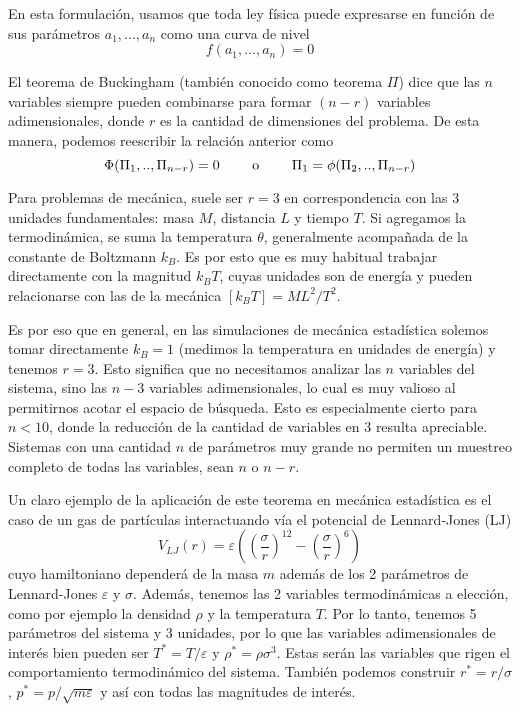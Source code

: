 En esta formulación, usamos que toda ley física puede expresarse en función de sus parámetros $a_1,...,a_n$ como una curva de nivel
\[ f(a_1,...,a_n) = 0 \]

El teorema de Buckingham\cite[pp. 21-22]{BOOK:KUNDU} (también conocido como teorema $\Pi$) dice que las $n$ variables siempre pueden combinarse para formar 
$(n-r)$ variables adimensionales, donde $r$ es la cantidad de dimensiones del problema. 
De esta manera, podemos reescribir la relación anterior como
\begin{equation}{\label{eq:teo_pi}}
\Phi(\Pi_1,..,\Pi_{n-r}) = 0 \qquad \text{ o } \qquad \Pi_1=\phi(\Pi_2,..,\Pi_{n-r})
\end{equation}

Para problemas de mecánica, suele ser $r=3$ en correspondencia con las 3 unidades fundamentales: masa $M$, distancia $L$ y tiempo $T$.
Si agregamos la termodinámica, se suma la temperatura $\theta$, generalmente acompañada de la constante de Boltzmann $k_B$.
Es por esto que es muy habitual trabajar directamente con la magnitud $k_BT$, cuyas unidades son de energía y pueden relacionarse con las de la mecánica $[k_BT] = ML^2/T^2$.

Es por eso que en general, en las simulaciones de mecánica estadística solemos tomar directamente $k_B=1$ (medimos la temperatura en unidades de energía) y tenemos $r=3$.
Esto significa que no necesitamos analizar las $n$ variables del sistema, sino las $n-3$ variables adimensionales, lo cual es muy valioso al permitirnos acotar el espacio de búsqueda.
Esto es especialmente cierto para $n<10$, donde la reducción de la cantidad de variables en 3 resulta apreciable.
Sistemas con una cantidad $n$ de parámetros muy grande no permiten un muestreo completo de todas las variables, sean $n$ o $n-r$.

Un claro ejemplo de la aplicación de este teorema en mecánica estadística es el caso de un gas de partículas interactuando vía el potencial de Lennard-Jones (LJ)
\[ V_{LJ}(r) = \varepsilon\left( \left( \frac{\sigma}{r} \right)^{12} - \left( \frac{\sigma}{r} \right)^6 \right) \]
cuyo hamiltoniano dependerá de la masa $m$ además de los 2 parámetros de Lennard-Jones $\varepsilon$ y $\sigma$.
Además, tenemos las 2 variables termodinámicas a elección, como por ejemplo la densidad $\rho$ y la temperatura $T$.
Por lo tanto, tenemos 5 parámetros del sistema y 3 unidades, por lo que las variables adimensionales de interés bien pueden ser $T^* = T/\varepsilon$ y $\rho^*=\rho\sigma^3$. 
Estas serán las variables que rigen el comportamiento termodinámico del sistema.
También podemos construir $r^*=r/\sigma$, $p^*=p/\sqrt{m\varepsilon}$ y así con todas las magnitudes de interés.

